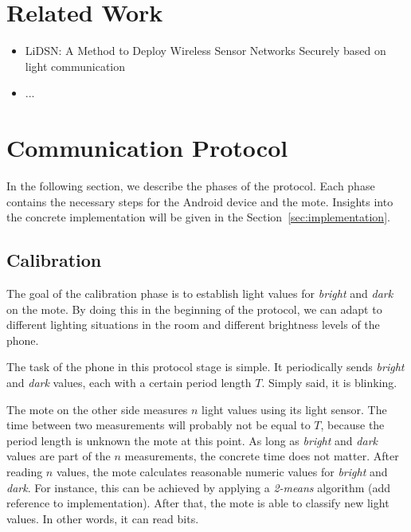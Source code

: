 \documentclass{sig-alternate} %
\begin{document}
\section{Related Work}
\label{sec:related_work}

\begin{itemize}
	\item LiDSN: A Method to Deploy Wireless Sensor Networks Securely based on light communication
	\item ...
\end{itemize}


\section{Communication Protocol}
\label{sec:communication_protocol}

In the following section, we describe the phases of the protocol. 
Each phase contains the necessary steps for the Android device and the mote.
Insights into the concrete implementation will be given in the Section~\ref{sec:implementation}.

\subsection{Calibration}
\label{sub:calibration}

The goal of the calibration phase is to establish light values for \textit{bright} and \textit{dark} on the mote.
By doing this in the beginning of the protocol, we can adapt to different lighting situations in the room and different brightness levels of the phone.

The task of the phone in this protocol stage is simple. 
It periodically sends \textit{bright} and \textit{dark} values, each with a certain period length $T$.
Simply said, it is blinking.

The mote on the other side measures $n$ light values using its light sensor.
The time between two measurements will probably not be equal to $T$, because the period length is unknown the mote at this point.
As long as \textit{bright} and \textit{dark} values are part of the $n$ measurements, the concrete time does not matter.
After reading $n$ values, the mote calculates reasonable numeric values for \textit{bright} and \textit{dark}.
For instance, this can be achieved by applying a \mbox{\textit{2-means}} algorithm (add reference to implementation).
After that, the mote is able to classify new light values.
In other words, it can read bits.
\end{document}

